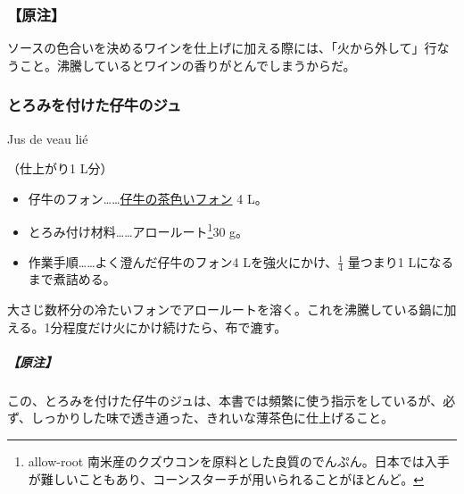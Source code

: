 \begin{recette}
{\subsubsection{【原注】}\label{nota-sauce-demi-glace}}

ソースの色合いを決めるワインを仕上げに加える際には、「火から外して」行なうこと。沸騰しているとワインの香りがとんでしまうからだ。

\atoaki{}

\hypertarget{jus-de-veau-lie}{%
\subsubsection{とろみを付けた仔牛のジュ}\label{jus-de-veau-lie}}

\begin{frsubenv}

Jus de veau lié

\end{frsubenv}


（仕上がり1 L分）

\begin{itemize}
\item
  仔牛のフォン\ldots{}\ldots{}\protect\hyperlink{jus-de-veau-brun}{仔牛の茶色いフォン}
  4 L。
\item
  とろみ付け材料\ldots{}\ldots{}アロールート\footnote{allow-root
    南米産のクズウコンを原料とした良質のでんぷん。日本では入手が難しいこともあり、コーンスターチが用いられることがほとんど。}30
  g。
\item
  作業手順\ldots{}\ldots{}よく澄んだ仔牛のフォン4
  Lを強火にかけ、\(\frac{1}{4}\) 量つまり1 Lになるまで煮詰める。
\end{itemize}

大さじ数杯分の冷たいフォンでアロールートを溶く。これを沸騰している鍋に加える。1分程度だけ火にかけ続けたら、布で漉す。

\hypertarget{nota-jus-de-veau-lie}{%
\subparagraph{【原注】}\label{nota-jus-de-veau-lie}}

この、とろみを付けた仔牛のジュは、本書では頻繁に使う指示をしているが、必ず、しっかりした味で透き通った、きれいな薄茶色に仕上げること。


\end{recette}
